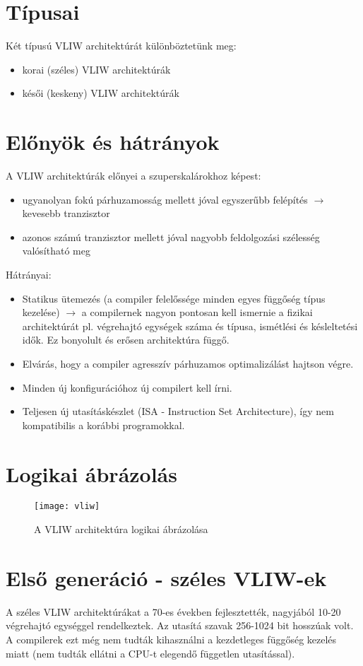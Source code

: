 \section{Típusai}
Két típusú VLIW architektúrát különböztetünk meg:
\begin{itemize}
    \item korai (széles) VLIW architektúrák
    \item késői (keskeny) VLIW architektúrák
\end{itemize}

\section{Előnyök és hátrányok}
A VLIW architektúrák előnyei a szuperskalárokhoz képest:
\begin{itemize}
    \item ugyanolyan fokú párhuzamosság mellett jóval egyszerűbb felépítés $\rightarrow$ kevesebb tranzisztor
    \item azonos számú tranzisztor mellett jóval nagyobb feldolgozási szélesség valósítható meg
\end{itemize}
Hátrányai:
\begin{itemize}
    \item Statikus ütemezés (a compiler felelőssége minden egyes függőség típus kezelése) $\rightarrow$ a compilernek nagyon pontosan kell ismernie a fizikai architektúrát pl. végrehajtó egységek száma és típusa, ismétlési és késleltetési idők. Ez bonyolult és erősen architektúra függő.
    \item Elvárás, hogy a compiler agresszív párhuzamos optimalizálást hajtson végre.
    \item Minden új konfigurációhoz új compilert kell írni.
    \item Teljesen új utasításkészlet (ISA - Instruction Set Architecture), így nem kompatibilis a korábbi programokkal.
\end{itemize}

\section{Logikai ábrázolás}
\begin{figure}[h]
    \texttt{[image: vliw]}
    \centering
    \caption{A VLIW architektúra logikai ábrázolása}
    \label{fig:vliw}
\end{figure}

\section{Első generáció - széles VLIW-ek}
A széles VLIW architektúrákat a 70-es években fejlesztették, nagyjából 10-20 végrehajtó egységgel rendelkeztek.
Az utasítá szavak 256-1024 bit hosszúak volt.
A compilerek ezt még nem tudták kihasználni a kezdetleges függőség kezelés miatt (nem tudták ellátni a CPU-t elegendő független utasítással).

